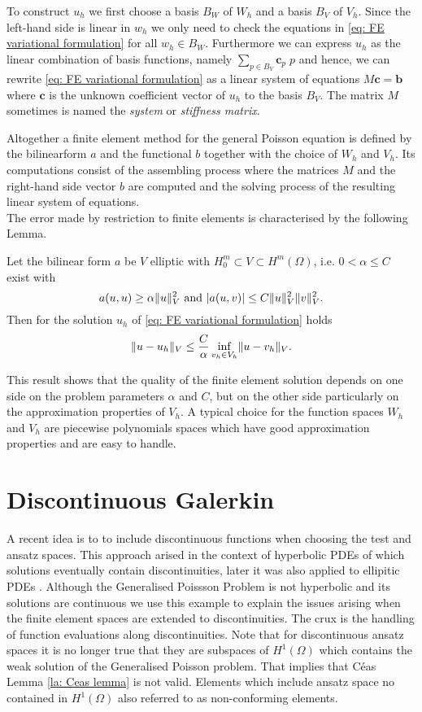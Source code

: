 To construct $u_h$ we first choose a basis $B_W$ of $W_h$ and a basis $B_V$ of $V_h$.
Since the left-hand side is linear in $w_h$ we only need to check the equations in \eqref{eq: FE variational formulation} for all $w_h \in B_W$. 
Furthermore we can express $u_h$ as the linear combination of basis functions, namely $\sum_{p \in B_V} \mathbf{c}_p \; p$ and hence, we can rewrite \eqref{eq: FE variational formulation} as a linear system of equations $M \mathbf{c} = \mathbf{b}$ where  $\mathbf{c}$ is the unknown coefficient vector of $u_h$ to the basis $B_V$.  The matrix $M$ sometimes is named the \emph{system} or \emph{stiffness matrix}.

Altogether a finite element method for the general Poisson equation is defined by the bilinearform $a$ and the functional $b$ together with the choice of $W_h$ and $V_h$. Its computations consist of the assembling process where the matrices $M$ and the right-hand side vector $b$ are computed and the solving process of the resulting linear system of equations.\\
The error made by restriction to finite elements is characterised by the following Lemma.
\begin{lemma} \label{la: Ceas lemma}
	Let the bilinear form $a$ be $V$ elliptic with $H_0^m \subset V \subset H^m(\Omega) $, i.e. $0 < \alpha \leq C$ exist with
	\[
		a(u,u) \geq \alpha  \lVert u \rVert ^2_V \text{ and } |a(u,v)| \leq C \lVert u \rVert ^2_V \lVert v \rVert ^2_V.
	\]
	Then for the solution $u_h$ of \eqref{eq: FE variational formulation}  holds
	\begin{align}
		\lVert u - u_h \rVert_V \leq \frac C \alpha \inf\limits_{v_h \in V_h} \lVert u-v_h \rVert_V.
	\end{align}
\end{lemma}
This result shows that the quality of the finite element solution depends on one side on the problem parameters $\alpha$ and $C$, but on the other side particularly on the approximation properties of $V_h$. A typical choice for the function spaces $W_h$ and $V_h$ are piecewise polynomials spaces which have good approximation properties and are easy to handle.

\section{Discontinuous Galerkin} \label{sec: SIPG}
A recent idea is to to include discontinuous functions when choosing the test and ansatz spaces. This approach arised in the context of hyperbolic PDEs of which solutions eventually contain discontinuities, later it was also applied to ellipitic PDEs \cite{ABC+2002}. Although the Generalised Poissson Problem is not hyperbolic and its solutions are continuous we use this example to explain the issues arising when the finite element spaces are extended to discontinuities. The crux is the handling of function evaluations along discontinuities. Note that for discontinuous ansatz spaces it is no longer true that they are subspaces of $H^1(\Omega)$ which contains the weak solution of the Generalised Poisson problem. That implies that C\'eas Lemma \ref{la: Ceas lemma} is not valid. Elements which include ansatz space no contained in $H^1(\Omega)$ also referred to as non-conforming elements.

